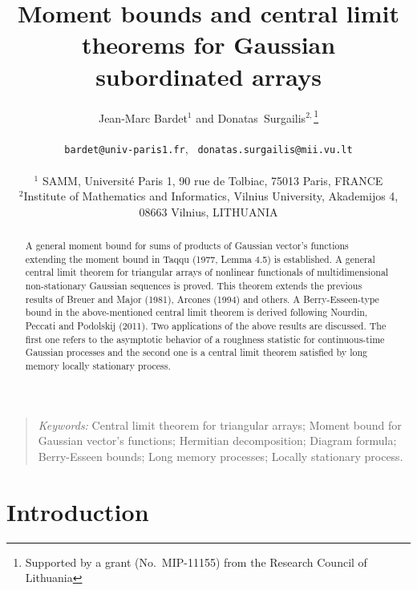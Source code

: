 \documentclass[10pt]{article}
\begin{document}
\title{\bf Moment bounds and central limit theorems for Gaussian
subordinated arrays}
\author{\centerline{Jean-Marc Bardet${}^1$ and Donatas~Surgailis${}^{2,}$\thanks
{Supported by a grant (No.\ MIP-11155) from the Research Council of Lithuania }
} \\
\small {\tt bardet@univ-paris1.fr}, \small {\tt
donatas.surgailis@mii.vu.lt}\\
~\\
{\small $^1$ SAMM, Universit\'e Paris 1, 90 rue de Tolbiac, 75013 Paris, FRANCE}\\
{\small $^{2}$Institute of Mathematics and Informatics,  Vilnius University, Akademijos
4, 08663 Vilnius, LITHUANIA}}
\maketitle
\begin{abstract}
A general moment bound for sums of products of Gaussian
vector's functions extending the moment bound in Taqqu (1977, Lemma
4.5) is established. A general central limit theorem for triangular arrays of nonlinear functionals of multidimensional non-stationary
Gaussian sequences is proved. This theorem extends the previous results of Breuer and Major (1981), Arcones (1994) and others.
A Berry-Esseen-type bound in the above-mentioned central limit theorem is derived following Nourdin, Peccati and Podolskij (2011).
Two  applications of the above results are discussed. The first one refers to the asymptotic behavior of a roughness
statistic for  continuous-time Gaussian processes and the second one is
a central limit theorem satisfied by long memory locally stationary process.
\end{abstract}
\begin{quote}
{\em Keywords:} {\small Central limit theorem for triangular arrays; Moment bound for Gaussian vector's functions; Hermitian decomposition; Diagram formula; Berry-Esseen bounds; Long memory processes;  Locally stationary process.}
\end{quote}



\vskip1cm

\section{Introduction}
\end{document}
